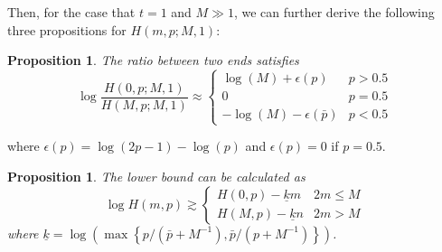 \documentclass{article}
\newtheorem{proposition}[theorem]{Proposition}
\begin{document}
Then, for the case that $t=1$ and $M\gg 1$, we can further derive the following three propositions for $H(m,p;M,1)$:
\begin{proposition}
\label{Ratio1}
The ratio between two ends satisfies
$$\log\frac{H(0,p;M,1)}{H(M,p;M,1)} \approx \left\{
    \begin{array}{cl}
    \log(M)+\epsilon(p) & p>0.5\\
    0 & p=0.5\\
    -\log(M)-\epsilon(\bar{p}) & p<0.5
    \end{array}\right.$$
\end{proposition}
where $\epsilon(p)=\log(2p-1)-\log(p)$ and $\epsilon(p)=0$ if $p=0.5$.
\begin{proposition}
\label{LowBound1}
The lower bound can be calculated as
\begin{equation*}
\log H(m,p)\gtrsim \left\{
    \begin{array}{cl}
    H(0,p)- \underline{k}m& 2m\leq M\\
    H(M,p)- \underline{k}n& 2m>M
    \end{array}\right.
\end{equation*}
where $\underline{k}=\log\left(\max\left\{p/(\bar{p}+M^{-1}),\bar{p}/(p+M^{-1})\right\}\right)$.
\end{proposition}
\end{document}
